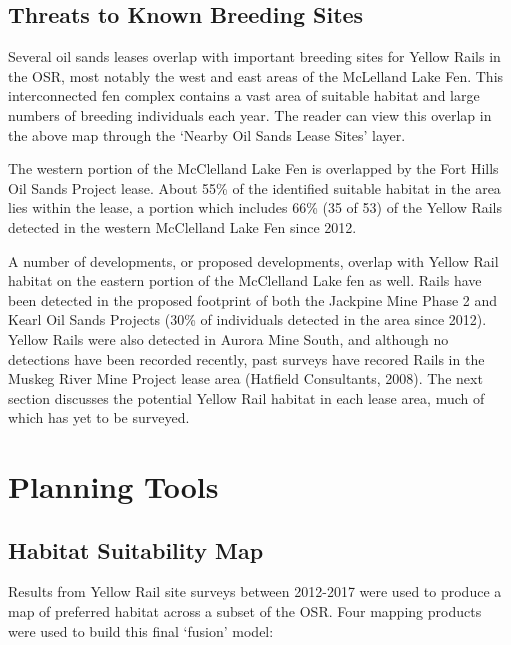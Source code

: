 \documentclass[11pt,]{article}
\begin{document}
\subsection{Threats to Known Breeding
Sites}\label{threats-to-known-breeding-sites}

Several oil sands leases overlap with important breeding sites for
Yellow Rails in the OSR, most notably the west and east areas of the
McLelland Lake Fen. This interconnected fen complex contains a vast area
of suitable habitat and large numbers of breeding individuals each year.
The reader can view this overlap in the above map through the `Nearby
Oil Sands Lease Sites' layer.

The western portion of the McClelland Lake Fen is overlapped by the Fort
Hills Oil Sands Project lease. About 55\% of the identified suitable
habitat in the area lies within the lease, a portion which includes 66\%
(35 of 53) of the Yellow Rails detected in the western McClelland Lake
Fen since 2012.

A number of developments, or proposed developments, overlap with Yellow
Rail habitat on the eastern portion of the McClelland Lake fen as well.
Rails have been detected in the proposed footprint of both the Jackpine
Mine Phase 2 and Kearl Oil Sands Projects (30\% of individuals detected
in the area since 2012). Yellow Rails were also detected in Aurora Mine
South, and although no detections have been recorded recently, past
surveys have recored Rails in the Muskeg River Mine Project lease area
(Hatfield Consultants, 2008). The next section discusses the potential
Yellow Rail habitat in each lease area, much of which has yet to be
surveyed.

\section{Planning Tools}\label{planning-tools}

\subsection{Habitat Suitability Map}\label{habitat-suitability-map}

Results from Yellow Rail site surveys between 2012-2017 were used to
produce a map of preferred habitat across a subset of the OSR. Four
mapping products were used to build this final `fusion' model:
\end{document}
